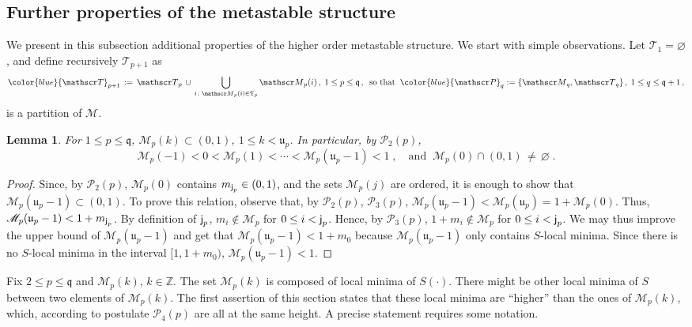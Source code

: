 \documentclass[reqno]{amsart}
\theoremstyle{plain}
\newtheorem{lemma}[theorem]{Lemma}
\theoremstyle{definition}
\newcommand{\mc}[1]{{\mathcal #1}}
\newcommand{\mf}[1]{{\mathfrak #1}}
\newcommand{\bb}[1]{{\mathbb #1}}
\newcommand{\ms}[1]{{\mathscr #1}}
\newcommand{\mss}[1]{{\textsf #1}}
\newcounter{as}[section]
\newcommand{\<}{\langle}
\renewcommand{\>}{\rangle}
\begin{document}
\subsection*{Further properties of the metastable structure}
\label{sec3b}

We present in this subsection additional properties of the higher order
metastable structure. We start with simple observations. Let
$\ms T_1 = \varnothing$, and define recursively $\ms T_{p+1}$ as
\begin{equation}
\label{80}
{\color{blue}\ms T_{p+1} } \,:=\, \ms T_p \,\cup\,
\bigcup_{i\colon \ms M_p(i)  \in \mf
T_p} \ms M_p(i) \,, \; 1\le p\le \mf q\,, \;\;
\text{so that}\;\;
{\color{blue} \ms P_{q}} := \{\ms M_{q} , \ms T_{q} \} \,,\;
1\le q\le \mf q+1\,,
\end{equation}
is a partition of $\mc M$.

\begin{lemma}
\label{l18}
For $1\le p\le \mf q$, $\ms M_{p} (k) \subset (0,1)$, $1\le k<\mf
u_{p}$. In particular, by  $\mc P_2(p)$,
\begin{equation}
\label{eq:1}
\ms M_p(-1) <  0< \ms M_p(1) < \cdots < \ms M_p(\mf u_p-1) < 1\;,
\quad \text{and}\;\;
\ms M_p(0)\cap (0,1) \,\neq\, \varnothing \;.
\end{equation}
\end{lemma}

\begin{proof}
Since, by $\mc P_2(p)$, $\ms M_{p}(0)$ contains
$m_{\mss j_{p}} \in (0,1)$, and the sets $\ms M_{p}(j)$ are ordered,
it is enough to show that $\ms M_{p}(\mf u_{p} -1) \subset (0,1)$.  To
prove this relation, observe that, by $\mc P_2(p)$, $\mc P_3(p)$,
$\ms M_{p}(\mf u_{p} -1) < \ms M_{p}(\mf u_{p}) = 1 + \ms
M_{p}(0)$. Thus, $\ms M_{p}(\mf u_p-1) < 1 + m_{\mss j_{p}}$.  By
definition of $\mss j_{p}$, $m_i\not\in\ms M_{p}$ for
$0\le i<\mss j_{p}$. Hence, by $\mc P_3(p)$,
$1+m_{i} \not\in\ms M_{p}$ for $0\le i<\mss j_{p}$. We may thus
improve the upper bound of $\ms M_{p}(\mf u_p-1)$ and get that
$\ms M_{p}(\mf u_p-1) < 1 + m_{0}$ because $\ms M_{p}(\mf u_p-1)$ only
contains $S$-local minima. Since there is no $S$-local minima in the
interval $[1,1+m_0)$, $\ms M_{p}(\mf u_p-1) < 1$.
\end{proof}


Fix $2\le p\le \mf q$ and $\ms M_p(k)$, $k\in \bb Z$. The set
$\ms M_p(k)$ is composed of local minima of $S(\cdot)$.
There might be other local minima of $S$ between two elements of
$\ms M_p(k)$. The first assertion of this section states
that these local minima are ``higher'' than the ones of
$\ms M_p(k)$, which, according to postulate $\mc P_4(p)$ are
all at the same height. A precise statement requires some notation.
\end{document}
